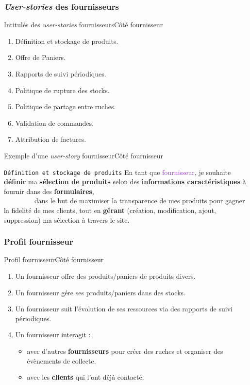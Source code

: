 \documentclass[usenames,dvipsnames]{beamer}
\begin{document}
\subsubsection*{\protect\textit{User-stories} des fournisseurs}
\begin{frame}{Intitulés des \textit{user-stories} fournisseurs}{Côté fournisseur}
\begin{enumerate}
  \item Définition et stockage de produits.
  \item Offre de Paniers.
  \item Rapports de suivi périodiques.
  \item Politique de rupture des stocks.
  \item Politique de partage entre ruches.
  \item Validation de commandes.
  \item Attribution de factures.
\end{enumerate}
\end{frame}

\begin{frame}{Exemple d'une \textit{user-story} fournisseur}{Côté fournisseur}
\begin{block}{\textcolor{Sepia}{\texttt{Définition et stockage de produits}}}
En tant que \textcolor{DarkOrchid}{fournisseur}, je souhaite {\color{BrickRed} \textbf{définir} ma \textbf{sélection de produits} selon des \textbf{informations caractéristiques} à fournir dans des \textbf{formulaires}},\\
~~~~~~~~~dans le but de {\color{OliveGreen}maximiser la transparence de mes produits pour gagner la fidelité de mes clients, tout en \textbf{gérant} (création, modification, ajout, suppression) ma sélection à travers le site}.
\end{block}
\end{frame}

\subsubsection*{Profil fournisseur}
\begin{frame}{Profil fournisseur}{Côté fournisseur}
\begin{enumerate}
  \item Un fournisseur offre des produits/paniers de produits divers.
  \item Un fournisseur gére ses produits/paniers dans des stocks.
  \item Un fournisseur suit l'évolution de ses ressources via des rapports de suivi périodiques.
  \item Un fournisseur interagit :
  \begin{itemize}
    \item avec d'autres \textbf{fournisseurs} pour créer des ruches et organiser des évènements de collecte.
    \item avec les \textbf{clients} qui l'ont déjà contacté.
  \end{itemize}
\end{enumerate}
\end{frame}
\end{document}
